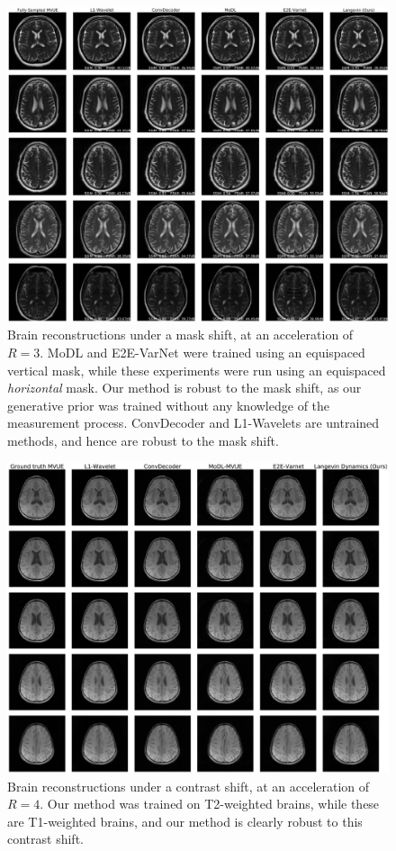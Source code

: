 \begin{figure}
    \centering
    \includegraphics[width=\columnwidth]{brain-equispaced-horizontal-R=3-comp.pdf}
    \caption{Brain reconstructions under a mask shift, at an acceleration of $R=3$. MoDL and E2E-VarNet were trained using an equispaced vertical mask, while these experiments were run using an equispaced \emph{horizontal} mask. Our method is robust to the mask shift, as our generative prior was trained without any knowledge of the measurement process. ConvDecoder and L1-Wavelets are untrained methods, and hence are robust to the mask shift.}
    \label{fig:brain-mask-shift-3}
\end{figure}


\begin{figure}
    \centering
    \includegraphics[width=\columnwidth]{brains-t1-equispaced-vertical-4-flipped-mvue-comp.pdf}
    \caption{Brain reconstructions under a contrast shift, at an acceleration of $R=4$. Our method was trained on T2-weighted brains, while these are T1-weighted brains, and our method is clearly robust to this contrast shift.}
    \label{fig:brain-t1-4}
\end{figure}

